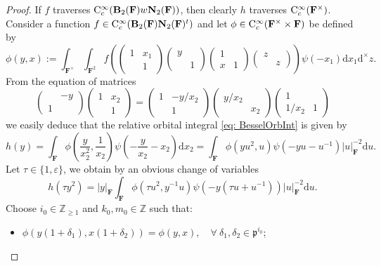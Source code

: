 \documentclass[A4]{amsart}
\def\geq{\geqslant}
\numberwithin{equation}{section} \everymath{\displaystyle}
\newcommand{\Cont}{{\rm C}}
\newcommand{\gp}[1]{\mathbf{#1}}
\newcommand{\Z}{\mathbb{Z}}
\newcommand{\ud}{\mathrm{d}}
\newcommand{\F}{\mathbf{F}}
\newcommand{\vp}{\mathfrak{p}}
\newcommand{\norm}[1][\cdot]{\lvert #1 \rvert}
\begin{document}
\begin{proof}
	If $f$ traverses $\Cont_c^{\infty}(\gp{B}_2(\F) w \gp{N}_2(\F))$, then clearly $h$ traverses $\Cont_c^{\infty}(\F^{\times})$. Consider a function $f \in \Cont_c^{\infty}(\gp{B}_2(\F) \gp{N}_2(\F)^t)$ and let $\phi \in \Cont_c^{\infty}(\F^{\times} \times \F)$ be defined by
	$$ \phi(y,x) := \int_{\F^{\times}}  \int_{\F^2} f \left( \begin{pmatrix} 1 & x_1 \\ & 1 \end{pmatrix} \begin{pmatrix} y & \\ & 1 \end{pmatrix} \begin{pmatrix} 1 & \\ x & 1 \end{pmatrix} \begin{pmatrix} z & \\ & z \end{pmatrix} \right) \psi(-x_1) \ud x_1 \ud^{\times} z. $$
	From the equation of matrices
	$$ \begin{pmatrix} & -y \\ 1 & \end{pmatrix} \begin{pmatrix} 1 & x_2 \\ & 1 \end{pmatrix} = \begin{pmatrix} 1 & -y/x_2 \\ & 1 \end{pmatrix} \begin{pmatrix} y/x_2 & \\ & x_2 \end{pmatrix} \begin{pmatrix} 1 & \\ 1/x_2 & 1 \end{pmatrix} $$
	we easily deduce that the relative orbital integral \eqref{eq: BesselOrbInt} is given by
	$$ h(y) = \int_{\F} \phi \left( \frac{y}{x_2^2}, \frac{1}{x_2} \right) \psi \left( - \frac{y}{x_2} - x_2 \right) \ud x_2 = \int_{\F} \phi(yu^2, u) \psi(-yu - u^{-1}) \norm[u]_{\F}^{-2} \ud u. $$
	Let $\tau \in \{ 1, \varepsilon \}$, we obtain by an obvious change of variables
	$$ h(\tau y^2) = \norm[y]_{\F} \int_{\F} \phi(\tau u^2, y^{-1}u) \psi(-y(\tau u + u^{-1})) \norm[u]_{\F}^{-2} \ud u. $$
	Choose $i_0 \in \Z_{\geq 1}$ and $k_0, m_0 \in \Z$ such that:
\begin{itemize}
	\item $\phi(y(1+\delta_1), x(1+\delta_2)) = \phi(y,x), \quad \forall \ \delta_1, \delta_2 \in \vp^{i_0}$;

\end{itemize}
\end{proof}
\end{document}

